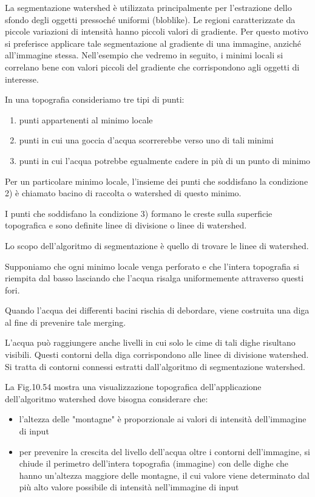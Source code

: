La segmentazione watershed è utilizzata principalmente per l'estrazione dello sfondo degli oggetti pressoché uniformi (bloblike). Le regioni caratterizzate da piccole variazioni di intensità hanno piccoli valori di gradiente. Per questo motivo si preferisce applicare tale segmentazione al gradiente di una immagine, anziché all'immagine stessa. Nell'esempio che vedremo in seguito, i minimi locali si correlano bene con valori piccoli del gradiente che corrispondono agli oggetti di interesse.

In una topografia consideriamo tre tipi di punti:
\begin{enumerate}
	\item punti appartenenti al minimo locale
	\item punti in cui una goccia d'acqua scorrerebbe verso uno di tali minimi
	\item punti in cui l'acqua potrebbe egualmente cadere in più di un punto di minimo
\end{enumerate}

Per un particolare minimo locale, l'insieme dei punti che soddisfano la condizione 2) è chiamato bacino di raccolta o watershed di questo minimo.

I punti che soddisfano la condizione 3) formano le creste sulla superficie topografica e sono definite linee di divisione o linee di watershed.

Lo scopo dell'algoritmo di segmentazione è quello di trovare le linee di watershed.

Supponiamo che ogni minimo locale venga perforato e che l'intera topografia si riempita dal basso lasciando che l'acqua risalga uniformemente attraverso questi fori.

Quando l'acqua dei differenti bacini rischia di debordare, viene costruita una diga al fine di prevenire tale merging.

L'acqua può raggiungere anche livelli in cui solo le cime di tali dighe risultano visibili. Questi contorni della diga corrispondono alle linee di divisione watershed. Si tratta di contorni connessi estratti dall'algoritmo di segmentazione watershed.

La Fig.10.54 mostra una visualizzazione topografica dell'applicazione dell'algoritmo watershed dove bisogna considerare che:
\begin{itemize}
	\item l'altezza delle "montagne" è proporzionale ai valori di intensità dell'immagine di input
	
	\item per prevenire la crescita del livello dell'acqua oltre i contorni dell'immagine, si chiude il perimetro dell'intera topografia (immagine) con delle dighe che hanno un'altezza maggiore delle montagne, il cui valore viene determinato dal più alto valore possibile di intensità nell'immagine di input
\end{itemize}

